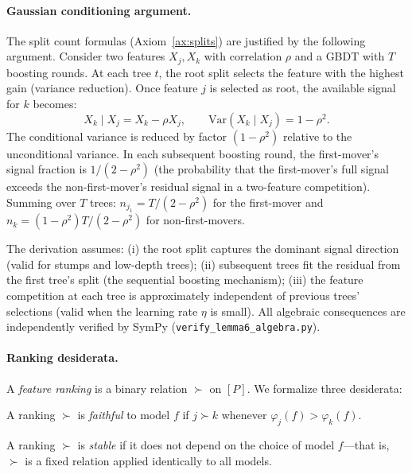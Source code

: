 \documentclass{jmlr}
\newcommand{\Var}{\mathrm{Var}}
\begin{document}
\paragraph{Gaussian conditioning argument.}
The split count formulas (Axiom~\ref{ax:splits}) are justified by the following argument. Consider two features $X_j, X_k$ with correlation $\rho$ and a GBDT with $T$ boosting rounds. At each tree $t$, the root split selects the feature with the highest gain (variance reduction). Once feature $j$ is selected as root, the available signal for $k$ becomes:
\[
  X_k \mid X_j = X_k - \rho X_j, \qquad \Var(X_k \mid X_j) = 1 - \rho^2.
\]
The conditional variance is reduced by factor $(1-\rho^2)$ relative to the unconditional variance. In each subsequent boosting round, the first-mover's signal fraction is $1/(2-\rho^2)$ (the probability that the first-mover's full signal exceeds the non-first-mover's residual signal in a two-feature competition). Summing over $T$ trees: $n_{j_1} = T/(2-\rho^2)$ for the first-mover and $n_k = (1-\rho^2)T/(2-\rho^2)$ for non-first-movers.

The derivation assumes: (i) the root split captures the dominant signal direction (valid for stumps and low-depth trees); (ii) subsequent trees fit the residual from the first tree's split (the sequential boosting mechanism); (iii) the feature competition at each tree is approximately independent of previous trees' selections (valid when the learning rate $\eta$ is small). All algebraic consequences are independently verified by SymPy (\texttt{verify\_lemma6\_algebra.py}).

\paragraph{Ranking desiderata.}
A \emph{feature ranking} is a binary relation $\succ$ on $[P]$.
We formalize three desiderata:

\begin{definition}[Faithful]
\label{def:faithful}
A ranking $\succ$ is \emph{faithful} to model $f$ if $j \succ k$ whenever $\varphi_j(f) > \varphi_k(f)$.
\end{definition}

\begin{definition}[Stable]
\label{def:stable}
A ranking $\succ$ is \emph{stable} if it does not depend on the choice of model $f$---that is, $\succ$ is a fixed relation applied identically to all models.
\end{definition}
\end{document}
